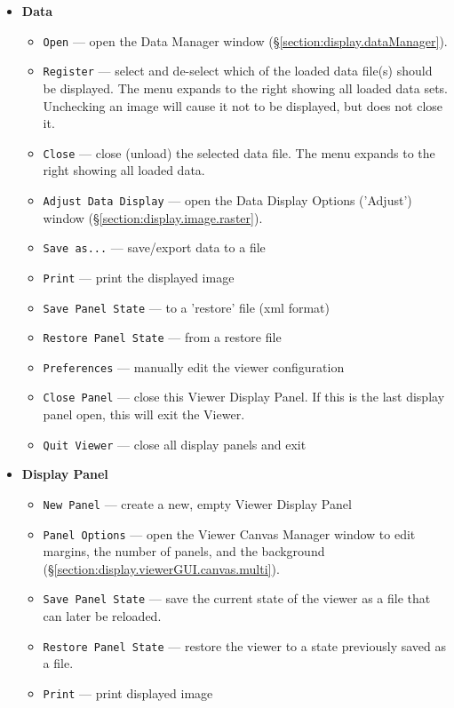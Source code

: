 \begin{itemize}
\item {\bf Data}
  \begin{itemize}
      \item  {\tt Open} --- open the Data Manager window (\S \ref{section:display.dataManager}).
      \item  {\tt Register} --- select and de-select which of the loaded
             data file(s) should be displayed. The menu expands
	     to the right showing all loaded data sets. Unchecking an image
	     will cause it not to be displayed, but does not close it. 
      \item  {\tt Close} --- close (unload) the selected data file. The menu
             expands to the right showing all loaded data.
      \item  {\tt Adjust Data Display} --- open the Data Display Options ('Adjust') window (\S \ref{section:display.image.raster}).
      \item  {\tt Save as...} --- save/export data to a file
      \item  {\tt Print} --- print the displayed image
      \item  {\tt Save Panel State} --- to a 'restore' file (xml format)
      \item  {\tt Restore Panel State} --- from a restore file
      \item  {\tt Preferences} --- manually edit the viewer configuration
      \item  {\tt Close Panel} --- close this Viewer Display Panel. If this is the last display
      panel open, this will exit the Viewer.
      \item  {\tt Quit Viewer} --- close all display panels and exit
  \end{itemize}
\item {\bf Display Panel}
  \begin{itemize}
      \item {\tt New Panel} --- create a new, empty Viewer Display Panel
      \item {\tt Panel Options} --- open the Viewer Canvas Manager window to edit margins, the number of panels, and the background (\S \ref{section:display.viewerGUI.canvas.multi}).
      \item  {\tt Save Panel State} --- save the current state of the viewer as a file that can later be reloaded.
      \item  {\tt Restore Panel State} --- restore the viewer to a state previously saved as a file.
      \item {\tt Print} --- print displayed image

\end{itemize}
\end{itemize}
